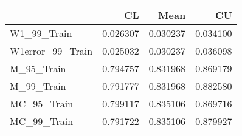\begin{tabular}{lrrr}
\toprule
{} &        CL &      Mean &        CU \\
\midrule
W1\_99\_Train      &  0.026307 &  0.030237 &  0.034100 \\
W1error\_99\_Train &  0.025032 &  0.030237 &  0.036098 \\
M\_95\_Train       &  0.794757 &  0.831968 &  0.869179 \\
M\_99\_Train       &  0.791777 &  0.831968 &  0.882580 \\
MC\_95\_Train      &  0.799117 &  0.835106 &  0.869716 \\
MC\_99\_Train      &  0.791722 &  0.835106 &  0.879927 \\
\bottomrule
\end{tabular}
